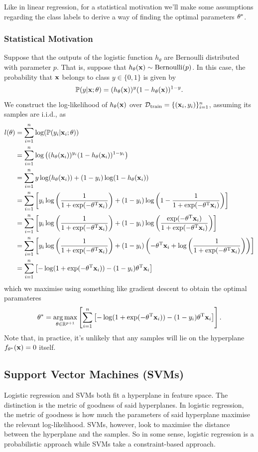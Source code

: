\documentclass[11pt]{article}
\begin{document}
\noindent Like in linear regression, for a statistical motivation we'll make some assumptions regarding the class labels to derive a way of finding the optimal parameters $\theta^{*}$.

\subsubsection{Statistical Motivation}
Suppose that the outputs of the logistic function $h_{\theta}$ are Bernoulli distributed with parameter $p$. That is, suppose that $h_{\theta}(\mathbf{x})\sim\text{Bernoulli}(p)$. In this case, the probability that $\mathbf{x}$ belongs to class $y\in\{0, 1\}$ is given by
$$
\mathbb{P}(y|\mathbf{x};\theta)=(h_{\theta}(\mathbf{x}))^{y}(1-h_{\theta}(\mathbf{x}))^{1-y}.
$$
We construct the log-likelihood of $h_{\theta}(\mathbf{x})$ over $\mathcal{D}_{\text{train}}=\{(\mathbf{x}_i,y_i)\}_{i=1}^n$, assuming its samples are i.i.d., as
\begin{align*}
    l(\theta)
    &=
    \sum_{i=1}^n\log(\mathbb{P}(y_i|\mathbf{x}_i;\theta))\\
    &=
    \sum_{i=1}^n\log\left((h_{\theta}(\mathbf{x}_i))^{y_i}(1-h_{\theta}(\mathbf{x}_i))^{1-y_i}\right)\\
    &=
    \sum_{i=1}^ny\log(h_{\theta}(\mathbf{x}_i))+(1-y_i)\log(1-h_{\theta}(\mathbf{x}_i))\\
    &=
    \sum_{i=1}^n\left[y_i\log\left(\frac{1}{1+\exp(-\theta^{\text{T}}\mathbf{x}_i)}\right)+(1-y_i)\log\left(1-\frac{1}{1+\exp(-\theta^{\text{T}}\mathbf{x}_i)}\right)\right]\\
    &=
    \sum_{i=1}^n\left[y_i\log\left(\frac{1}{1+\exp(-\theta^{\text{T}}\mathbf{x}_i)}\right)+(1-y_i)\log\left(\frac{\exp(-\theta^{\text{T}}\mathbf{x}_i)}{1+\exp(-\theta^{\text{T}}\mathbf{x}_i)}\right)\right]\\
    &=
    \sum_{i=1}^n\left[y_i\log\left(\frac{1}{1+\exp(-\theta^{\text{T}}\mathbf{x}_i)}\right)+(1-y_i)\left(-\theta^{\text{T}}\mathbf{x}_i+\log\left(\frac{1}{1+\exp(-\theta^{\text{T}}\mathbf{x}_i)}\right)\right)\right]\\
    &=
    \sum_{i=1}^n\left[-\log(1+\exp(-\theta^{\text{T}}\mathbf{x}_i))-(1-y_i)\theta^{\text{T}}\mathbf{x}_i\right]
\end{align*}
which we maximise using something like gradient descent to obtain the optimal paramateres
$$
\theta^{*}
=
\operatorname*{arg\,max}_{\theta\in\mathbb{R}^{p+1}}\left[\sum_{i=1}^n\left[-\log(1+\exp(-\theta^{\text{T}}\mathbf{x}_i))-(1-y_i)\theta^{\text{T}}\mathbf{x}_i\right]\right].
$$
Note that, in practice, it's unlikely that any samples will lie on the hyperplane $f_{\theta^*}(\mathbf{x})=0$ itself.

\subsection{Support Vector Machines (SVMs)}
Logistic regression and SVMs both fit a hyperplane in feature space. The distinction is the metric of goodness of said hyperplanes. In logistic regression, the metric of goodness is how much the parameters of said hyperplane maximise the relevant log-likelihood. SVMs, however, look to maximise the distance between the hyperplane and the samples. So in some sense, logistic regression is a probabilistic approach while SVMs take a constraint-based approach.
\end{document}
